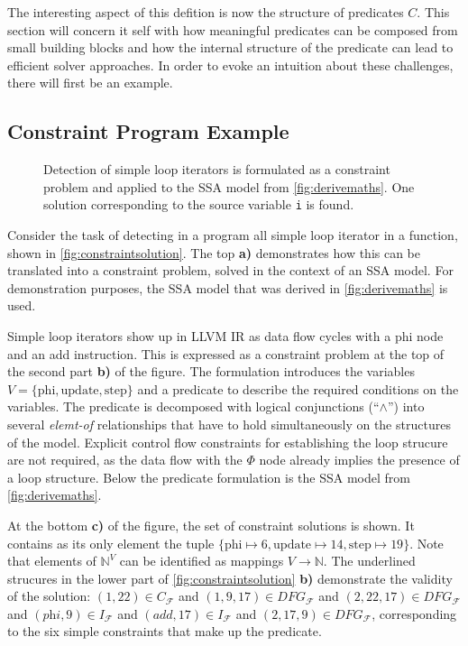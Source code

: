    The interesting aspect of this defition is now the structure of predicates
    $C$.
    This section will concern it self with how meaningful predicates can be
    composed from small building blocks and how the internal structure of the
    predicate can lead to efficient solver approaches.
    In order to evoke an intuition about these challenges, there will first be
    an example.

\subsection{Constraint Program Example}

\begin{figure}[p]
    
\caption{Detection of simple loop iterators is formulated as a constraint
         problem and applied to the SSA model from \autoref{fig:derivemaths}.
         One solution corresponding to the source variable {\tt i} is found.}
\label{fig:constraintsolution}
\end{figure}

    Consider the task of detecting in a program all simple loop iterator in a
    function, shown in \autoref{fig:constraintsolution}.
    The top {\bf a)} demonstrates how this can be translated into a constraint
    problem, solved in the context of an SSA model.
    For demonstration purposes, the SSA model that was derived in
    \autoref{fig:derivemaths} is used.

    Simple loop iterators show up in LLVM IR as data flow cycles with a phi node
    and an add instruction.
    This is expressed as a constraint problem at the top of the second part
    {\bf b)} of the figure.
    The formulation introduces the variables
    $V=\{\text{phi}, \text{update}, \text{step}\}$ and a predicate to
    describe the required conditions on the variables.
    The predicate is decomposed with logical conjunctions (``$\land$'') into
    several {\em elemt-of} relationships that have to hold simultaneously on the
    structures of the model.
    Explicit control flow constraints for establishing the loop strucure are not
    required, as the data flow with the $\Phi$ node already implies the presence
    of a loop structure.
    Below the predicate formulation is the SSA model from
    \autoref{fig:derivemaths}.

    At the bottom {\bf c)} of the figure, the set of constraint solutions is
    shown.
    It contains as its only element the tuple
    $\{\text{phi}\mapsto6,\text{update}\mapsto14,\text{step}\mapsto19\}$.
    Note that elements of $\mathbb N^V$ can be identified as mappings
    $V\rightarrow\mathbb N$.
    The underlined strucures in the lower part of
    \autoref{fig:constraintsolution} {\bf b)} demonstrate the validity of the
    solution:
    $(1,22)\in C_\mathcal F$ and $(1,9,17)\in DFG_\mathcal F$ and
    $(2,22,17)\in DFG_\mathcal F$ and $(\textit{phi},9)\in I_\mathcal F$ and
    $(\textit{add},17)\in I_\mathcal F$ and $(2,17,9)\in DFG_\mathcal F$,
    corresponding to the six simple constraints that make up the predicate.

